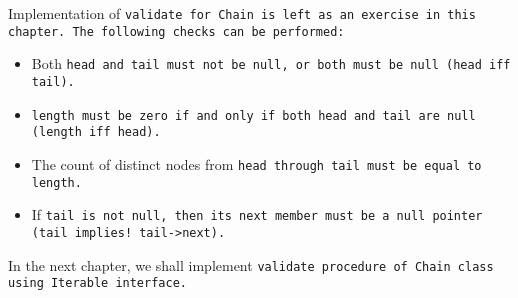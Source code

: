 Implementation of \tt{validate} for \tt{Chain}
is left as an exercise in this chapter.
The following checks can be performed:

\begin{itemize}

\item Both \tt{head} and \tt{tail} must not be null,
or both must be null (\tt{head iff tail}).

\item \tt{length} must be zero if and only if both
\tt{head} and \tt{tail} are null (\tt{length iff head}).

\item The count of distinct nodes from \tt{head}
through \tt{tail} must be equal to \tt{length}.

\item If \tt{tail} is not null, then its \tt{next} member must
be a null pointer (\tt{tail implies}\s\s\tt{! tail->next}).

\end{itemize}

\note In the next chapter, we shall implement \tt{validate}
procedure of \tt{Chain} class using \tt{Iterable} interface.
